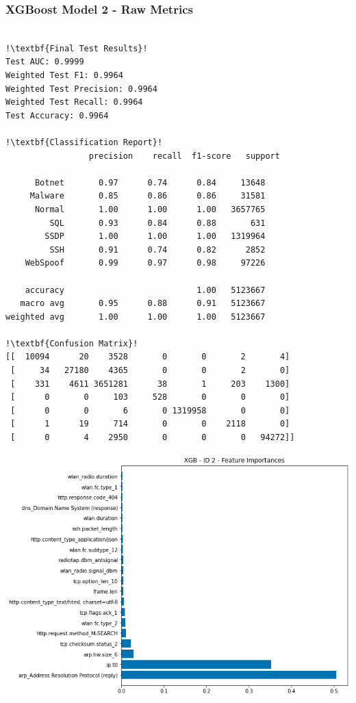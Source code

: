 \begin{appendices}
\subsubsection{XGBoost Model 2 - Raw Metrics}
\begin{lstlisting}[escapechar=!]

!\textbf{Final Test Results}!
Test AUC: 0.9999
Weighted Test F1: 0.9964
Weighted Test Precision: 0.9964
Weighted Test Recall: 0.9964
Test Accuracy: 0.9964

!\textbf{Classification Report}!
			     precision    recall  f1-score   support

      Botnet       0.97      0.74      0.84     13648
     Malware       0.85      0.86      0.86     31581
      Normal       1.00      1.00      1.00   3657765
         SQL       0.93      0.84      0.88       631
        SSDP       1.00      1.00      1.00   1319964
         SSH       0.91      0.74      0.82      2852
    WebSpoof       0.99      0.97      0.98     97226

    accuracy                           1.00   5123667
   macro avg       0.95      0.88      0.91   5123667
weighted avg       1.00      1.00      1.00   5123667
    
!\textbf{Confusion Matrix}!    
[[  10094      20    3528       0       0       2       4]
 [     34   27180    4365       0       0       2       0]
 [    331    4611 3651281      38       1     203    1300]
 [      0       0     103     528       0       0       0]
 [      0       0       6       0 1319958       0       0]
 [      1      19     714       0       0    2118       0]
 [      0       4    2950       0       0       0   94272]]

\end{lstlisting}
\begin{center}
	\centering
	\includegraphics[width=\textwidth]{Appendices/Images/XGB/Model2/XGB_Model2_FI.png}
\end{center}


\end{appendices}
